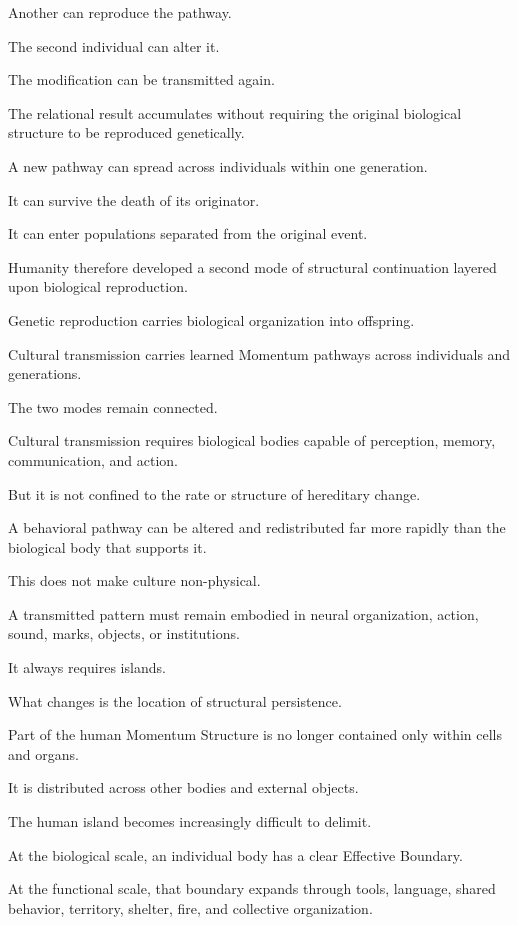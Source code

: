 Another can reproduce the pathway.

The second individual can alter it.

The modification can be transmitted again.

The relational result accumulates without requiring the original biological structure to be reproduced genetically.

A new pathway can spread across individuals within one generation.

It can survive the death of its originator.

It can enter populations separated from the original event.

Humanity therefore developed a second mode of structural continuation layered upon biological reproduction.

Genetic reproduction carries biological organization into offspring.

Cultural transmission carries learned Momentum pathways across individuals and generations.

The two modes remain connected.

Cultural transmission requires biological bodies capable of perception, memory, communication, and action.

But it is not confined to the rate or structure of hereditary change.

A behavioral pathway can be altered and redistributed far more rapidly than the biological body that supports it.

This does not make culture non-physical.

A transmitted pattern must remain embodied in neural organization, action, sound, marks, objects, or institutions.

It always requires islands.

What changes is the location of structural persistence.

Part of the human Momentum Structure is no longer contained only within cells and organs.

It is distributed across other bodies and external objects.

The human island becomes increasingly difficult to delimit.

At the biological scale, an individual body has a clear Effective Boundary.

At the functional scale, that boundary expands through tools, language, shared behavior, territory, shelter, fire, and collective organization.

